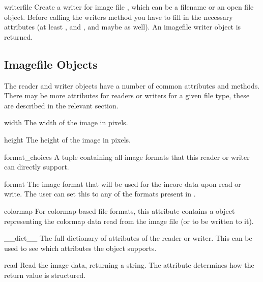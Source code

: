\begin{funcdesc}{writer}{file}
Create a writer for image file , which can be a filename or
an open file object. Before calling the
writers  method you have to fill in the necessary
attributes (at least ,  and , and
maybe  as well). An imagefile writer object is returned.
\end{funcdesc}

\subsection{Imagefile Objects}
\label{imagefile-objects}

The reader and writer objects have a number of common attributes and
methods. There may be more attributes for readers or writers for a
given file type, these are described in the relevant section.

\begin{memberdesc}[imagefile]{width}
The width of the image in pixels.
\end{memberdesc}
\begin{memberdesc}[imagefile]{height}
The height of the image in pixels.
\end{memberdesc}
\begin{memberdesc}[imagefile]{format_choices}
A tuple containing all image formats that this reader or writer can
directly support.
\end{memberdesc}
\begin{memberdesc}[imagefile]{format}
The image format that will be used for the incore data upon read or
write. The user can set this to any of the formats present in
.
\end{memberdesc}
\begin{memberdesc}[imagefile]{colormap}
For colormap-based file formats, this attribute contains a
 object representing the colormap data read from the
image file (or to be written to it).
\end{memberdesc}
\begin{memberdesc}[imagefile]{__dict__}
The full dictionary of attributes of the reader or writer. This can be
used to see which attributes the object supports.
\end{memberdesc}

\begin{methoddesc}[imagefile]{read}{}
Read the image data, returning a string. The  attribute
determines how the return value is structured.
\end{methoddesc}

